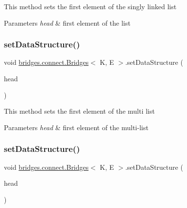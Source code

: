 This method sets the first element of the singly linked list


\begin{DoxyParams}{Parameters}
{\em head} & first element of the list \\
\hline
\end{DoxyParams}
\hypertarget{classbridges_1_1connect_1_1_bridges_aa0538ceb84f553a9c5a1cbc7a93a46ae}{}\label{classbridges_1_1connect_1_1_bridges_aa0538ceb84f553a9c5a1cbc7a93a46ae} 
\subsubsection{\texorpdfstring{set\+Data\+Structure()}{setDataStructure()}\hspace{0.1cm}{\footnotesize\ttfamily [3/12]}}
{\footnotesize\ttfamily void \hyperlink{classbridges_1_1connect_1_1_bridges}{bridges.\+connect.\+Bridges}$<$ K, E $>$.set\+Data\+Structure (\begin{DoxyParamCaption}\item[{\hyperlink{classbridges_1_1base_1_1_m_lelement}{M\+Lelement}$<$ E $>$}]{head }\end{DoxyParamCaption})}

This method sets the first element of the multi list


\begin{DoxyParams}{Parameters}
{\em head} & first element of the multi-\/list \\
\hline
\end{DoxyParams}
\hypertarget{classbridges_1_1connect_1_1_bridges_a383877f85bb048d47560e76f359e1bda}{}\label{classbridges_1_1connect_1_1_bridges_a383877f85bb048d47560e76f359e1bda} 
\subsubsection{\texorpdfstring{set\+Data\+Structure()}{setDataStructure()}\hspace{0.1cm}{\footnotesize\ttfamily [4/12]}}
{\footnotesize\ttfamily void \hyperlink{classbridges_1_1connect_1_1_bridges}{bridges.\+connect.\+Bridges}$<$ K, E $>$.set\+Data\+Structure (\begin{DoxyParamCaption}\item[{\hyperlink{classbridges_1_1base_1_1_d_lelement}{D\+Lelement}$<$ E $>$}]{head }\end{DoxyParamCaption})}

